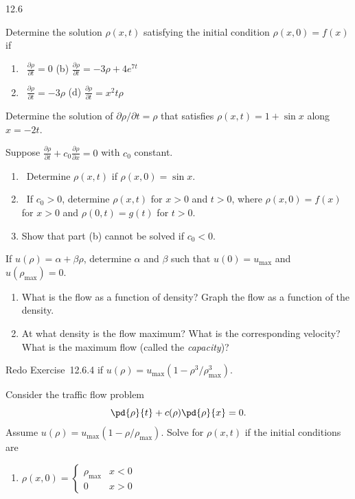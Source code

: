 \begin{exercises}{12.6}

\item \label{ex:12.6.1}
Determine the solution $\rho(x,t)$ satisfying the initial condition $\rho(x,0) = f(x)$ if
\begin{enumerate}
\item[(a)]\starred\ $\frac{\partial\rho}{\partial t} = 0$ \hfill (b) $\frac{\partial\rho}{\partial t} = -3\rho + 4e^{7t}$
\item[(c)]\starred\ $\frac{\partial\rho}{\partial t} = -3\rho$ \hfill (d) $\frac{\partial\rho}{\partial t} = x^2 t\rho$
\end{enumerate}

\item\starred \label{ex:12.6.2}
Determine the solution of $\partial\rho/\partial t = \rho$ that satisfies $\rho(x,t) = 1 + \sin x$ along $x = -2t$.

\item \label{ex:12.6.3}
Suppose $\frac{\partial\rho}{\partial t} + c_0\frac{\partial\rho}{\partial x} = 0$ with $c_0$ constant.
\begin{enumerate}
\item[(a)]\starred\ Determine $\rho(x,t)$ if $\rho(x,0) = \sin x$.
\item[(b)]\starred\ If $c_0 > 0$, determine $\rho(x,t)$ for $x > 0$ and $t > 0$, where $\rho(x,0) = f(x)$ for $x > 0$ and $\rho(0,t) = g(t)$ for $t > 0$.
\item[(c)] Show that part (b) cannot be solved if $c_0 < 0$.
\end{enumerate}

\item\starred \label{ex:12.6.4}
If $u(\rho) = \alpha + \beta\rho$, determine $\alpha$ and $\beta$ such that $u(0) = u_{\max}$ and $u(\rho_{\max}) = 0$.
\begin{enumerate}
\item[(a)] What is the flow as a function of density?  Graph the flow as a function of the density.
\item[(b)] At what density is the flow maximum?  What is the corresponding velocity?  What is the maximum flow (called the \emph{capacity})?
\end{enumerate}

\item \label{ex:12.6.5}
Redo Exercise~12.6.4 if $u(\rho) = u_{\max}(1 - \rho^3/\rho_{\max}^3)$.

\item \label{ex:12.6.6}
Consider the traffic flow problem
\[
\pd{\rho}{t} + c(\rho)\pd{\rho}{x} = 0.
\]
Assume $u(\rho) = u_{\max}(1 - \rho/\rho_{\max})$.  Solve for $\rho(x,t)$ if the initial conditions are
\begin{enumerate}
\item[(a)] $\rho(x,0) = \begin{cases} \rho_{\max} & x < 0 \\ 0 & x > 0 \end{cases}$


\end{enumerate}
\end{exercises}
